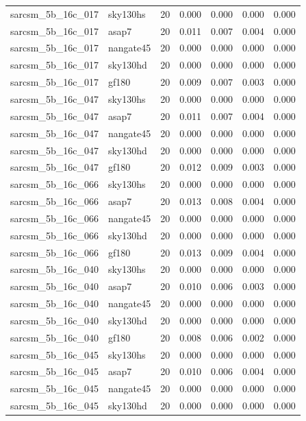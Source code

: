 \begin{tabular}{llrrrrr}
sarcsm\_5b\_16c\_017 & sky130hs & 20 & 0.000 & 0.000 & 0.000 & 0.000 \\
sarcsm\_5b\_16c\_017 & asap7 & 20 & 0.011 & 0.007 & 0.004 & 0.000 \\
sarcsm\_5b\_16c\_017 & nangate45 & 20 & 0.000 & 0.000 & 0.000 & 0.000 \\
sarcsm\_5b\_16c\_017 & sky130hd & 20 & 0.000 & 0.000 & 0.000 & 0.000 \\
sarcsm\_5b\_16c\_017 & gf180 & 20 & 0.009 & 0.007 & 0.003 & 0.000 \\
sarcsm\_5b\_16c\_047 & sky130hs & 20 & 0.000 & 0.000 & 0.000 & 0.000 \\
sarcsm\_5b\_16c\_047 & asap7 & 20 & 0.011 & 0.007 & 0.004 & 0.000 \\
sarcsm\_5b\_16c\_047 & nangate45 & 20 & 0.000 & 0.000 & 0.000 & 0.000 \\
sarcsm\_5b\_16c\_047 & sky130hd & 20 & 0.000 & 0.000 & 0.000 & 0.000 \\
sarcsm\_5b\_16c\_047 & gf180 & 20 & 0.012 & 0.009 & 0.003 & 0.000 \\
sarcsm\_5b\_16c\_066 & sky130hs & 20 & 0.000 & 0.000 & 0.000 & 0.000 \\
sarcsm\_5b\_16c\_066 & asap7 & 20 & 0.013 & 0.008 & 0.004 & 0.000 \\
sarcsm\_5b\_16c\_066 & nangate45 & 20 & 0.000 & 0.000 & 0.000 & 0.000 \\
sarcsm\_5b\_16c\_066 & sky130hd & 20 & 0.000 & 0.000 & 0.000 & 0.000 \\
sarcsm\_5b\_16c\_066 & gf180 & 20 & 0.013 & 0.009 & 0.004 & 0.000 \\
sarcsm\_5b\_16c\_040 & sky130hs & 20 & 0.000 & 0.000 & 0.000 & 0.000 \\
sarcsm\_5b\_16c\_040 & asap7 & 20 & 0.010 & 0.006 & 0.003 & 0.000 \\
sarcsm\_5b\_16c\_040 & nangate45 & 20 & 0.000 & 0.000 & 0.000 & 0.000 \\
sarcsm\_5b\_16c\_040 & sky130hd & 20 & 0.000 & 0.000 & 0.000 & 0.000 \\
sarcsm\_5b\_16c\_040 & gf180 & 20 & 0.008 & 0.006 & 0.002 & 0.000 \\
sarcsm\_5b\_16c\_045 & sky130hs & 20 & 0.000 & 0.000 & 0.000 & 0.000 \\
sarcsm\_5b\_16c\_045 & asap7 & 20 & 0.010 & 0.006 & 0.004 & 0.000 \\
sarcsm\_5b\_16c\_045 & nangate45 & 20 & 0.000 & 0.000 & 0.000 & 0.000 \\
sarcsm\_5b\_16c\_045 & sky130hd & 20 & 0.000 & 0.000 & 0.000 & 0.000 \\

\end{tabular}
